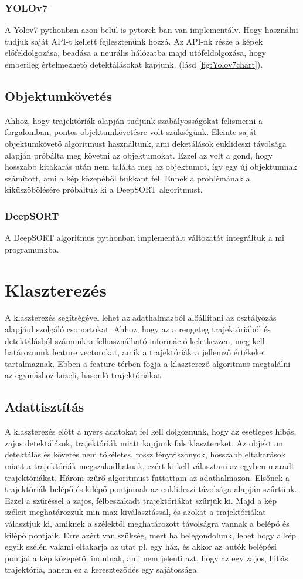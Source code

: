 \documentclass[12pt,a4paper]{article}
\begin{document}
\subsubsection{YOLOv7}
A Yolov7 pythonban azon belül is pytorch-ban van implementálv. Hogy használni tudjuk saját API-t kellett fejlesztenünk hozzá.
Az API-nk része a képek előfeldolgozása, beadása a neurális hálózatba majd utófeldolgozása, hogy emberileg értelmezhető detektálásokat
kapjunk. (lásd \ref{fig:Yolov7chart}).
\subsection{Objektumkövetés}
Ahhoz, hogy trajektóriák alapján tudjunk szabályosságokat felismerni a forgalomban, pontos objektumkövetésre volt szükségünk. Eleinte
saját objektumkövető algoritmust használtunk, ami deketálások euklideszi távolsága alapján próbálta meg követni az objektumokat.
Ezzel az volt a gond, hogy hosszabb kitakarás után nem találta meg az objektumot, így egy új objektumnak számított, ami a kép
közepéből bukkant fel. Ennek a problémának a kiküszöbölésére próbáltuk ki a DeepSORT algoritmust.
\subsubsection{DeepSORT}
A DeepSORT algoritmus pythonban implementált változatát integráltuk a mi programunkba.

\newpage
\section{Klaszterezés}
A klaszterezés segítségével lehet az adathalmazból alőállítani az osztályozás alapjául szolgáló csoportokat. Ahhoz, hogy az
a rengeteg trajektóriából és detektálásból számunkra felhasználható információ keletkezzen, meg kell határoznunk feature
vectorokat, amik a trajektóriákra jellemző értékeket tartalmaznak. Ebben a feature térben fogja a klaszterező algoritmus
megtalálni az egymáshoz közeli, hasonló trajektóriákat.
\subsection{Adattisztítás}
A klaszterezés előtt a nyers adatokat fel kell dolgoznunk, hogy az esetleges hibás, zajos detektálások, trajektóriák miatt
kapjunk fals klasztereket. Az objektum detektálás és követés nem tökéletes, rossz fényviszonyok, hosszabb eltakarások miatt
a trajektóriák megszakadhatnak, ezért ki kell választani az egyben maradt trajektóriákat. Három szűrő algoritmust futtattam 
az adathalmazon. Elsőnek a trajektóriák belépő és kilépő pontjainak az euklideszi távolsága alapján szűrtünk. Ezzel a szűréssel a zajos, félbeszakadt trajektóriákat szűrjük ki.
Majd a kép széleit meghatározzuk min-max kiválasztással, és azokat a trajektóriákat választjuk ki, amiknek a szélektől meghatározott
távolságra vannak a belépő és kilépő pontjaik. Erre azért van szükség, mert ha belegondolunk, lehet hogy a kép egyik szélén valami eltakarja az utat pl. egy ház, és akkor az autók belépési pontjai a kép közepétől indulnak, ami nem jelenti azt, hogy az egy zajos, hibás trajektória, hanem ez a kereszteződés egy sajátossága.
\end{document}
